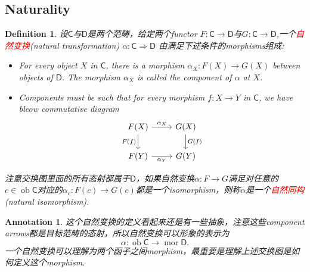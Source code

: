 \documentclass{article}
\newtheorem{definition}[theorem]{Definition}
\newtheorem{annotation}[theorem]{Annotation}
\newcommand*{\cat}[1]{\textsf{#1}\xspace}
\DeclareMathOperator{\ob}{ob}
\DeclareMathOperator{\mor}{mor}
\newcommand{\redt}[1]{\textcolor{red}{#1}}
\begin{document}
\subsection{Naturality}
\begin{definition}
\rm 设$\cat{C}$与$\cat{D}$是两个范畴，给定两个functor $F \colon \cat{C}\rightarrow \cat{D}$与$G \colon \cat{C} \rightarrow \cat{D}$,一个\redt{自然变换}(natural transformation) $\alpha:\cat{C} \Rightarrow \cat{D}$ 由满足下述条件的morphisms组成:
\begin{itemize}
	\item For every object $X$ in $\cat{C}$, there is a morphism $\alpha_X: F(X) \to G(X)$ between objects of $\cat{D}$. The morphism $\alpha_X$ is called the component of $\alpha$ at $X$. 
	\item Components must be such that for every morphism $f:X \to Y$ in $\cat{C}$, we have bleow commutative diagram
	$$
\begin{tikzcd}
F(X) \arrow[r, "\alpha_X"] \arrow[d, "F(f)"'] & G(X) \arrow[d, "G(f)"] \\
F(Y) \arrow[r, "\alpha_Y"']                & G(Y)             
\end{tikzcd}
$$ 
\end{itemize}

注意交换图里面的所有态射都属于$\cat{D}$，如果自然变换$\alpha \colon F \rightarrow G$满足对任意的$c \in \ob\cat{C}$对应的$\alpha_{c} : F(c) \to G(c)$都是一个isomorphism，则称$\alpha$是一个\redt{自然同构}(natural isomorphism). 
\end{definition}

\begin{annotation}
\rm 这个自然变换的定义看起来还是有一些抽象，注意这些component arrows都是目标范畴的态射，所以自然变换可以形象的表示为
$$
\alpha \colon \ob\cat{C} \rightarrow \mor\cat{D}. 
$$
一个自然变换可以理解为两个函子之间morphism，最重要是理解上述交换图是如何定义这个morphism. 
\end{annotation}
\end{document}
